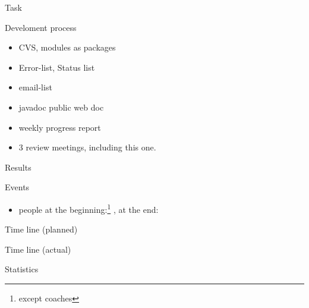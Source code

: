 

\begin{myslide}{Task}
  
\end{myslide}


\begin{myslide}{Develoment process}
  \begin{itemize}
  \item CVS, modules as packages
  \item Error-list, Status list
  \item email-list
  \item javadoc public web doc
  \item weekly progress report
  \item 3 review meetings, including this one. 
  \end{itemize}
\end{myslide}







\begin{myslide}{Results}
  
\end{myslide}



\begin{myslide}{Events}
  \begin{itemize}
  \item people at the beginning:\footnote{except coaches} ,
    at the end: 
  \end{itemize}
\end{myslide}

\begin{myslide}{Time line (planned)}

\end{myslide}
\begin{myslide}{Time line  (actual)}
  
\end{myslide}

\begin{myslide}{Statistics}
  
\end{myslide}




